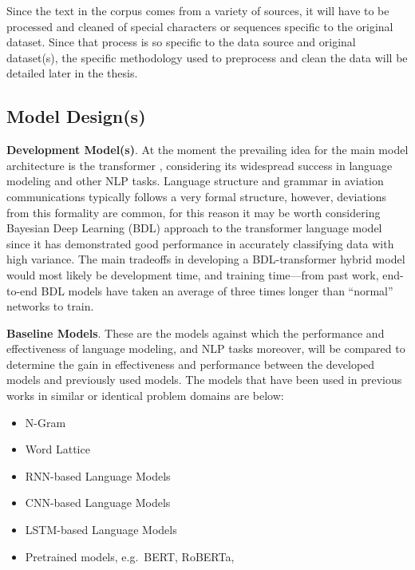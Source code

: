 \documentclass[10pt]{article}
\begin{document}
        Since the text in the corpus comes from a variety of sources, it will have to be processed and cleaned of special characters
        or sequences specific to the original dataset. Since that process is so specific to the data source and original dataset(s),
        the specific methodology used to preprocess and clean the data will be detailed later in the thesis.

        \subsection{Model Design(s)}
        \textbf{Development Model(s)}. At the moment the prevailing idea for the main model architecture is the transformer
        \cite{vaswani_attention_2017}, considering its widespread success in language modeling and other NLP tasks. Language structure
        and grammar in aviation communications typically follows a very formal structure, however, deviations from this formality are
        common, for this reason it may be worth considering Bayesian Deep Learning (BDL) approach to the transformer language model
        since it has demonstrated good performance in accurately classifying data with high variance. The main tradeoffs in developing
        a BDL-transformer hybrid model would most likely be development time, and training time---from past work, end-to-end BDL models
        have taken an average of three times longer than ``normal'' networks to train.


        \textbf{Baseline Models}. These are the models against which the performance and effectiveness of language modeling, and NLP
        tasks moreover, will be compared to determine the gain in effectiveness and performance between the developed models and
        previously used models. The models that have been used in previous works in similar or identical problem domains are below:

        \begin{multicols}{2}
            \begin{itemize}
                \item N-Gram
                \item Word Lattice
                \item RNN-based Language Models
                \item CNN-based Language Models
                \item LSTM-based Language Models
                \item Pretrained models, e.g.~BERT, RoBERTa,
            \end{itemize}
        \end{multicols}
\end{document}
